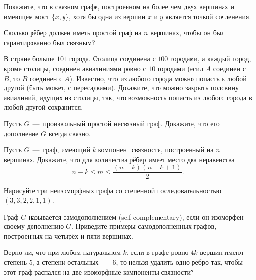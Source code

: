 \begin{exersize} 
	Покажите, что в связном графе, построенном на более чем двух вершинах
	и имеющем мост $\{ x, y \}$, хотя бы одна из вершин $x$ и $y$ является
	точкой сочленения. 
\end{exersize}

\begin{exersize} 
	Сколько рёбер должен иметь простой граф на $n$ вершинах, 
	чтобы он был гарантированно был связным?
\end{exersize}

\begin{exersize}
	В стране больше $101$ города. Столица соединена с $100$ городами, а каждый город, кроме столицы, соединен авиалиниями ровно с 
	$10$ городами (есил $A$ соединен с $B$, то $B$ соединен с $A$). Известно, что из любого города можно попасть в любой другой 
	(быть может, с пересадками). Докажите, что можно закрыть половину авиалиний, идущих из столицы, так, что возможность попасть 
	из любого города в любой другой сохранится.
\end{exersize}

\begin{exersize}
	Пусть $G$~---~произвольный простой несвязный граф. Докажите, что его дополнение $\overline{G}$ всегда связно.
\end{exersize}	

\begin{exersize}
	Пусть $G$~---~граф, имеющий $k$ компонент связности, построенный на $n$ вершинах. Докажите, что для количества рёбер 
	имеет место два неравенства $$n-k \leqslant m \leqslant \frac{(n-k)(n-k+1)}{2}.$$
\end{exersize}

\begin{exersize}
	Нарисуйте три неизоморфных графа со степенной последовательностью $(3, 3, 2, 2, 1, 1)$.
\end{exersize}

\begin{exersize}
	Граф $G$ называется самодополнением (self-complementary), если он изоморфен своему дополнению $\overline{G}$. 
	Приведите примеры самодополненных графов, построенных на четырёх и пяти вершинах.
\end{exersize}

\begin{exersize}
	Верно ли, что при любом натуральном $k$, если в графе ровно $4k$ вершин имеют степень $5$, а степени остальных~---~$6$, 
	то нельзя удалить одно ребро так, чтобы этот граф распался на две изоморфные компоненты связности?
\end{exersize}

